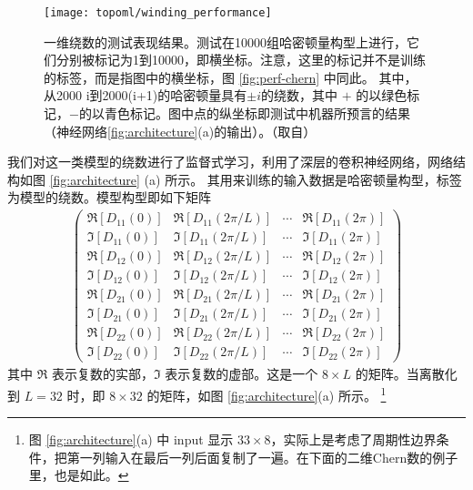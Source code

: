 \begin{figure}[!htb]
\centering
\texttt{[image: topoml/winding\_performance]}
\caption{一维绕数的测试表现结果。测试在10000组哈密顿量构型上进行，它们分别被标记为1到10000，即横坐标。注意，这里的标记并不是训练的标签，而是指图中的横坐标，图 \ref{fig:perf-chern} 中同此。
其中，从2000 i到2000(i+1)的哈密顿量具有$\pm i$的绕数，其中 $+$ 的以绿色标记，$-$的以青色标记。图中点的纵坐标即测试中机器所预言的结果（神经网络\ref{fig:architecture}(a)的输出）。（取自）}
\label{fig:perf-winding}
\end{figure}

我们对这一类模型的绕数进行了监督式学习，利用了深层的卷积神经网络，网络结构如图 \ref{fig:architecture} (a) 所示。
其用来训练的输入数据是哈密顿量构型，标签为模型的绕数。模型构型即如下矩阵
\begin{align}
    \begin{pmatrix}
        \Re[D_{11}(0)] & \Re[D_{11}(2\pi/L)] & \cdots & \Re[D_{11}(2\pi)] \\
        \Im[D_{11}(0)] & \Im[D_{11}(2\pi/L)] & \cdots & \Im[D_{11}(2\pi)] \\
        \Re[D_{12}(0)] & \Re[D_{12}(2\pi/L)] & \cdots & \Re[D_{12}(2\pi)] \\
        \Im[D_{12}(0)] & \Im[D_{12}(2\pi/L)] & \cdots & \Im[D_{12}(2\pi)] \\
        \Re[D_{21}(0)] & \Re[D_{21}(2\pi/L)] & \cdots & \Re[D_{21}(2\pi)] \\
        \Im[D_{21}(0)] & \Im[D_{21}(2\pi/L)] & \cdots & \Im[D_{21}(2\pi)] \\
        \Re[D_{22}(0)] & \Re[D_{22}(2\pi/L)] & \cdots & \Re[D_{22}(2\pi)] \\
        \Im[D_{22}(0)] & \Im[D_{22}(2\pi/L)] & \cdots & \Im[D_{22}(2\pi)]
    \end{pmatrix}
\end{align}
其中 $\Re$ 表示复数的实部，$\Im$ 表示复数的虚部。这是一个 $8\times L$ 的矩阵。当离散化到 $L=32$ 时，即 $8\times32$ 的矩阵，如图 \ref{fig:architecture}(a) 所示。
\footnote{图 \ref{fig:architecture}(a) 中 input 显示 $33\times8$，实际上是考虑了周期性边界条件，把第一列输入在最后一列后面复制了一遍。在下面的二维Chern数的例子里，也是如此。}

